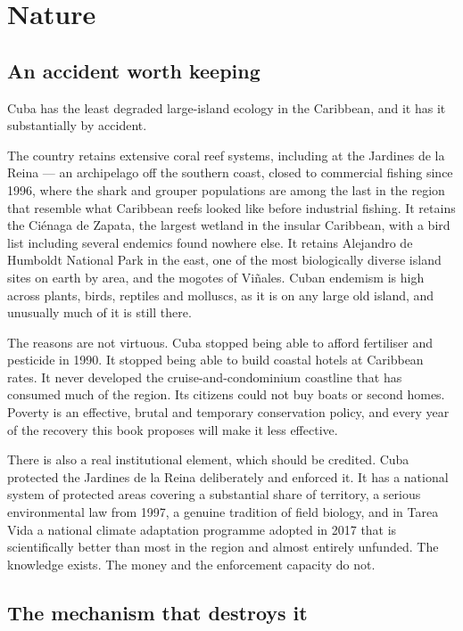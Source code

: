 \chapter{Nature}
\label{ch:nature}

\section{An accident worth keeping}

Cuba has the least degraded large-island ecology in the Caribbean, and it has it
substantially by accident.

The country retains extensive coral reef systems, including at the Jardines de la
Reina --- an archipelago off the southern coast, closed to commercial fishing
since 1996, where the shark and grouper populations are among the last in the
region that resemble what Caribbean reefs looked like before industrial fishing.
It retains the Ci\'enaga de Zapata, the largest wetland in the insular Caribbean,
with a bird list including several endemics found nowhere else. It retains
Alejandro de Humboldt National Park in the east, one of the most biologically
diverse island sites on earth by area, and the mogotes of Vi\~nales. Cuban
endemism is high across plants, birds, reptiles and molluscs, as it is on any
large old island, and unusually much of it is still there.

The reasons are not virtuous. Cuba stopped being able to afford fertiliser and
pesticide in 1990. It stopped being able to build coastal hotels at Caribbean
rates. It never developed the cruise-and-condominium coastline that has consumed
much of the region. Its citizens could not buy boats or second homes. Poverty is
an effective, brutal and temporary conservation policy, and every year of the
recovery this book proposes will make it less effective.

There is also a real institutional element, which should be credited. Cuba
protected the Jardines de la Reina deliberately and enforced it. It has a
national system of protected areas covering a substantial share of territory, a
serious environmental law from 1997, a genuine tradition of field biology, and in
Tarea Vida a national climate adaptation programme adopted in 2017 that is
scientifically better than most in the region and almost entirely unfunded. The
knowledge exists. The money and the enforcement capacity do not.

\section{The mechanism that destroys it}

